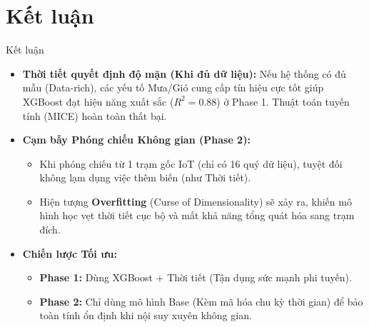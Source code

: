 \section{Kết luận}

\begin{frame}{Kết luận}
  \begin{itemize}
    \item \textbf{Thời tiết quyết định độ mặn (Khi đủ dữ liệu):} Nếu hệ thống có đủ mẫu (Data-rich), các yếu tố Mưa/Gió cung cấp tín hiệu cực tốt giúp XGBoost đạt hiệu năng xuất sắc ($R^2 = 0.88$) ở Phase 1. Thuật toán tuyến tính (MICE) hoàn toàn thất bại.
    \item \textbf{Cạm bẫy Phóng chiếu Không gian (Phase 2):} 
      \begin{itemize}
        \item Khi phóng chiếu từ 1 trạm gốc IoT (chỉ có 16 quý dữ liệu), tuyệt đối không lạm dụng việc thêm biến (như Thời tiết).
        \item Hiện tượng \textbf{Overfitting} (Curse of Dimensionality) sẽ xảy ra, khiến mô hình học vẹt thời tiết cục bộ và mất khả năng tổng quát hóa sang trạm đích.
      \end{itemize}
    \item \textbf{Chiến lược Tối ưu:} 
      \begin{itemize}
        \item \textbf{Phase 1:} Dùng XGBoost + Thời tiết (Tận dụng sức mạnh phi tuyến).
        \item \textbf{Phase 2:} Chỉ dùng mô hình Base (Kèm mã hóa chu kỳ thời gian) để bảo toàn tính ổn định khi nội suy xuyên không gian.
      \end{itemize}
  \end{itemize}
\end{frame}
